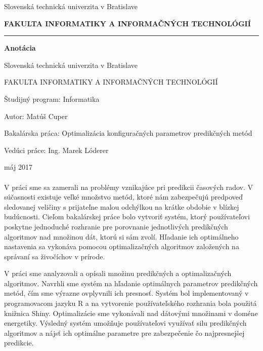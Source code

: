 \documentclass[a4paper,slovak,12pt,appendix]{article}
\begin{document}


\begin{titlepage}
\begin{center}
  {\small Slovenská technická univerzita v Bratislave \par}
  {\small \textbf{FAKULTA INFORMATIKY A INFORMAČNÝCH TECHNOLÓGIÍ}}
  \rule{\textwidth}{1pt}

  \vspace*{1.5cm}
  \begin{Large}
    \textbf{Anotácia} \par
  \end{Large}
\end{center}
{Slovenská technická univerzita v Bratislave \par}
{FAKULTA INFORMATIKY A INFORMAČNÝCH TECHNOLÓGIÍ \par}
{Študijný program: Informatika \par}
{Autor: Matúš Cuper \par}
{Bakalárska práca: Optimalizácia konfiguračných parametrov predikčných metód \par}
{Vedúci práce: Ing. Marek Lóderer \par}
{máj 2017 \\} \\
V práci sme sa zamerali na problémy vznikajúce pri predikcii časových radov.
V súčasnosti existuje veľké množstvo metód, ktoré nám zabezpečujú predpoveď
sledovanej veličiny s prijateľne malou odchýlkou na krátke obdobie v blízkej
budúcnosti. Cieľom bakalárskej práce bolo vytvoriť systém, ktorý používateľovi
poskytne jednoduché rozhranie pre porovnanie jednotlivých predikčných
algoritmov nad množinou dát, ktorú si sám zvolí. Hľadanie ich optimálneho
nastavenia sa vykonáva pomocou optimalizačných algoritmov založených na
správaní sa živočíchov v prírode.

V práci sme analyzovali a opísali množinu predikčných a optimalizačných
algoritmov. Navrhli sme systém na hľadanie optimálnych parametrov predikčných
metód, čím sme výrazne ovplyvnili ich presnosť. Systém bol implementovaný
v programovacom jazyku R a na vytvorenie používateľského rozhrania bola použitá
knižnica Shiny. Optimalizácie sme vykonávali nad dátovými množinami v doméne
energetiky. Výsledný systém umožňuje používateľovi využívať silu predikčných
algoritmov a nájsť ich optimálne parametre pre zabezpečenie čo najpresnejšej
predikcie.
\end{titlepage}
\end{document}

